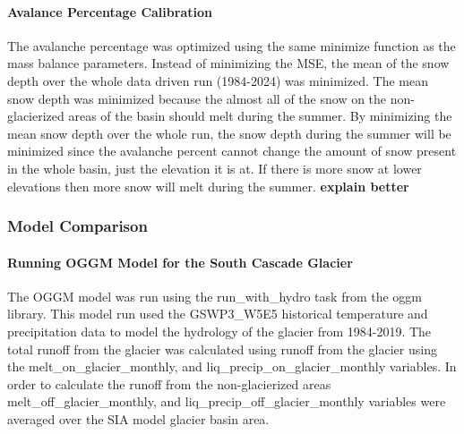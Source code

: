 \documentclass{article}
\begin{document}
\paragraph{Avalance Percentage Calibration}
The avalanche percentage was optimized using the same minimize function as the mass balance parameters. Instead of minimizing the MSE, the mean of the 
snow depth over the whole data driven run (1984-2024) was minimized. The mean snow depth was minimized because the almost all of the snow on the 
non-glacierized areas of the basin should melt during the summer. By minimizing the mean snow depth over the whole run, the snow depth during 
the summer will be minimized since the avalanche percent cannot change the amount of snow present in the whole basin, just the elevation it is at. If 
there is more snow at lower elevations then more snow will melt during the summer.
\textbf{explain better}
\subsubsection{Model Comparison}
\paragraph{Running OGGM Model for the South Cascade Glacier}
The OGGM model was run using the run\_with\_hydro task from the oggm library. This model run used the GSWP3\_W5E5 historical temperature and 
precipitation data \cite{ref10} to model the hydrology of the glacier from 1984-2019. The total runoff from the glacier was calculated using 
runoff from the glacier using the melt\_on\_glacier\_monthly, and liq\_precip\_on\_glacier\_monthly variables. In order 
to calculate the runoff from the non-glacierized areas melt\_off\_glacier\_monthly, and liq\_precip\_off\_glacier\_monthly variables were averaged over the 
SIA model glacier basin area. 
\end{document}
